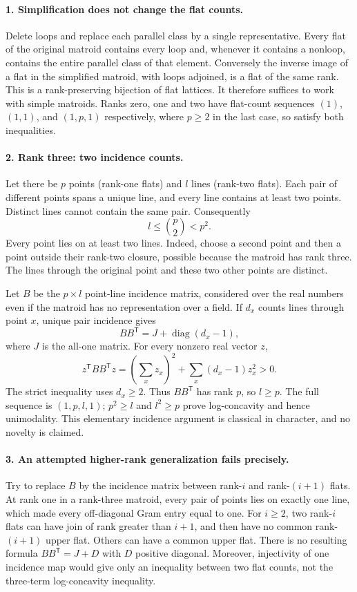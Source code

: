 \documentclass[11pt,a4paper]{article}
\begin{document}
\paragraph{1. Simplification does not change the flat counts.}
Delete loops and replace each parallel class by a single representative.
Every flat of the original matroid contains every loop and, whenever
it contains a nonloop, contains the entire parallel class of that
element. Conversely the inverse image of a flat in the simplified
matroid, with loops adjoined, is a flat of the same rank. This is a
rank-preserving bijection of flat lattices. It therefore suffices to
work with simple matroids. Ranks zero, one and two have flat-count
sequences $(1)$, $(1,1)$, and $(1,p,1)$ respectively, where $p\ge2$
in the last case, so satisfy both inequalities.

\paragraph{2. Rank three: two incidence counts.}
Let there be $p$ points (rank-one flats) and $l$ lines (rank-two
flats). Each pair of different points spans a unique line, and every
line contains at least two points. Distinct lines cannot contain the
same pair. Consequently
\[
 l\le\binom p2<p^2.
\]
Every point lies on at least two lines. Indeed, choose a second point
and then a point outside their rank-two closure, possible because the
matroid has rank three. The lines through the original point and these
two other points are distinct.

Let $B$ be the $p\times l$ point-line incidence matrix, considered over
the real numbers even if the matroid has no representation over a field.
If $d_x$ counts lines through point $x$, unique pair incidence gives
\[
 BB^{\mathsf T}=J+\operatorname{diag}(d_x-1),
\]
where $J$ is the all-one matrix. For every nonzero real vector $z$,
\[
 z^{\mathsf T}BB^{\mathsf T}z
 =\left(\sum_xz_x\right)^2+\sum_x(d_x-1)z_x^2>0.
\]
The strict inequality uses $d_x\ge2$. Thus $BB^{\mathsf T}$ has
rank $p$, so $l\ge p$. The full sequence is $(1,p,l,1)$;
$p^2\ge l$ and $l^2\ge p$ prove log-concavity and hence unimodality.
This elementary incidence argument is classical in character, and no
novelty is claimed.

\paragraph{3. An attempted higher-rank generalization fails precisely.}
Try to replace $B$ by the incidence matrix between rank-$i$ and
rank-$(i+1)$ flats. At rank one in a rank-three matroid, every pair of
points lies on exactly one line, which made every off-diagonal Gram
entry equal to one. For $i\ge2$, two rank-$i$ flats can have join
of rank greater than $i+1$, and then have no common rank-$(i+1)$
upper flat. Others can have a common upper flat. There is no resulting
formula $BB^{\mathsf T}=J+D$ with $D$ positive diagonal. Moreover,
injectivity of one incidence map would give only an inequality between
two flat counts, not the three-term log-concavity inequality.
\end{document}
